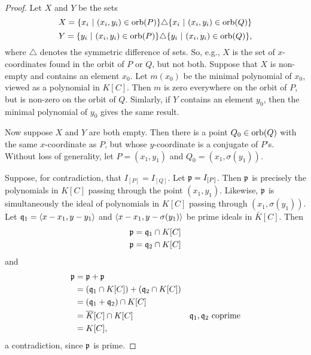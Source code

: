 \begin{proof}
  Let $X$ and $Y$ be the sets
    \[ X = \{ x_i ~|~ (x_i, y_i) \in \orb(P) \} \triangle \{ x_i ~|~ (x_i, y_i) \in \orb(Q) \} \]
    \[ Y = \{ y_i ~|~ (x_i, y_i) \in \orb(P) \} \triangle \{ y_i ~|~ (x_i, y_i) \in \orb(Q) \}, \]
    where $\triangle$ denotes the symmetric difference of sets.
  So, e.g., $X$ is the set of $x$-coordinates found in the orbit of $P$ or $Q$, but not both.
  Suppose that $X$ is non-empty and contains an element $x_0$.
  Let $m(x_0)$ be the minimal polynomial of $x_0$, viewed as a polynomial in $K[C]$.
  Then $m$ is zero everywhere on the orbit of $P$, but is non-zero on the orbit of $Q$.
  Simlarly, if $Y$ contains an element $y_0$, then the minimal polynomial of $y_0$ gives the same result.

  Now suppose $X$ and $Y$ are both empty.
  Then there is a point $Q_0 \in \orb(Q)$ with the same $x$-coordinate as $P$, but whose $y$-coordinate is a conjugate of $P$'s.
  Without loss of generality, let $P = (x_1, y_1)$ and $Q_0 = (x_1, \sigma(y_1))$.
  
  Suppose, for contradiction, that $I_{[P]} = I_{[Q]}$.
  Let $\frak p = I_{[P]}$.
  Then $\frak p$ is precisely the polynomials in $K[C]$ passing through the point $(x_1, y_1)$.
  Likewise, $\frak p$ is simultaneously the ideal of polynomials in $K[C]$ passing through $(x_1, \sigma(y_1))$.
  Let $\frak q_1 = \pid{x - x_1, y - y_1}$ and $\pid{x - x_1, y - \sigma(y_1)}$ be prime ideals in $\bar K[C]$.
  Then
  \begin{align*}
    \frak p &= \frak q_1 \cap K[C] \\
    \frak p &= \frak q_2 \cap K[C]
  \end{align*}
  and
  \begin{align*}
    \frak p
      &= \frak p + \frak p \\
      &= (\frak q_1 \cap K[C]) + (\frak q_2 \cap K[C]) \\
      &= (\frak q_1 + \frak q_2) \cap K[C] \\
      &= \bar K[C] \cap K[C] & \text{$\frak q_1, \frak q_2$ coprime} \\
      &= K[C],
  \end{align*}
  a contradiction, since $\frak p$ is prime.
\end{proof}

